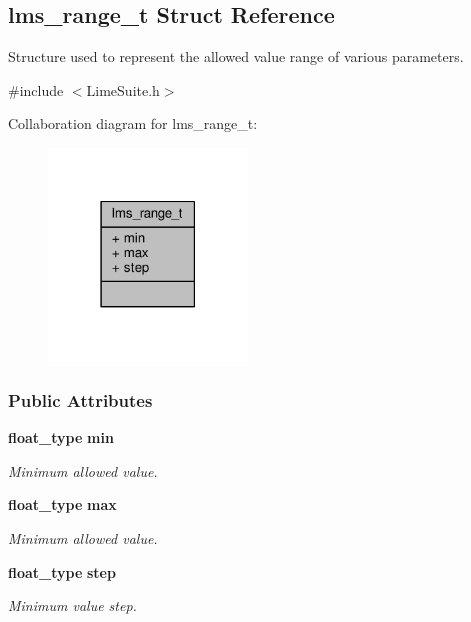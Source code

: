 \subsection{lms\+\_\+range\+\_\+t Struct Reference}
\label{structlms__range__t}


Structure used to represent the allowed value range of various parameters.  




{\ttfamily \#include $<$Lime\+Suite.\+h$>$}



Collaboration diagram for lms\+\_\+range\+\_\+t\+:
\nopagebreak
\begin{figure}[H]
\begin{center}
\leavevmode
\includegraphics[width=150pt]{d9/d6e/structlms__range__t__coll__graph}
\end{center}
\end{figure}
\subsubsection*{Public Attributes}
\begin{DoxyCompactItemize}
\item 
{\bf float\+\_\+type} {\bf min}
\begin{DoxyCompactList}\small\item\em Minimum allowed value. \end{DoxyCompactList}\item 
{\bf float\+\_\+type} {\bf max}
\begin{DoxyCompactList}\small\item\em Minimum allowed value. \end{DoxyCompactList}\item 
{\bf float\+\_\+type} {\bf step}
\begin{DoxyCompactList}\small\item\em Minimum value step. \end{DoxyCompactList}\end{DoxyCompactItemize}


